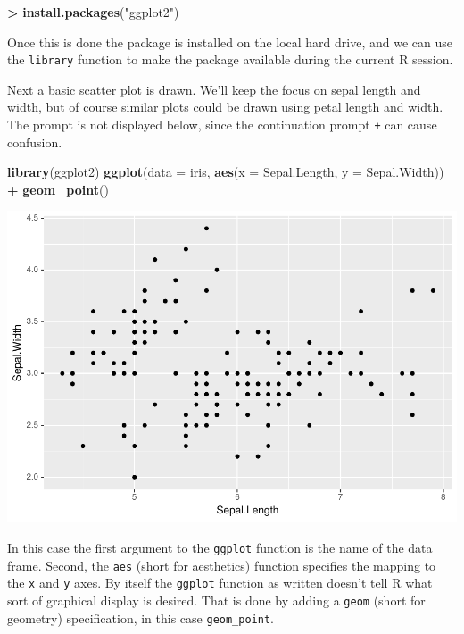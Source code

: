 \documentclass[
]{krantz}
\makeatletter
\newenvironment{Shaded}{\begin{snugshade}}{\end{snugshade}}
\newcommand{\DataTypeTok}[1]{\textcolor[rgb]{0.27,0.27,0.27}{#1}}
\newcommand{\KeywordTok}[1]{\textcolor[rgb]{0.27,0.27,0.27}{\textbf{#1}}}
\newcommand{\NormalTok}[1]{#1}
\newcommand{\OperatorTok}[1]{\textcolor[rgb]{0.43,0.43,0.43}{\textbf{#1}}}
\newcommand{\StringTok}[1]{\textcolor[rgb]{0.5,0.5,0.5}{#1}}
\newenvironment{kframe}{%
\medskip{}
\setlength{\fboxsep}{.8em}
 \def\at@end@of@kframe{}%
 \ifinner\ifhmode%
  \def\at@end@of@kframe{\end{minipage}}%
  \begin{minipage}{\columnwidth}%
 \fi\fi%
 \def\FrameCommand##1{\hskip\@totalleftmargin \hskip-\fboxsep
 \colorbox{shadecolor}{##1}\hskip-\fboxsep
     \hskip-\linewidth \hskip-\@totalleftmargin \hskip\columnwidth}%
 \MakeFramed {\advance\hsize-\width
   \@totalleftmargin\z@ \linewidth\hsize
   \@setminipage}}%
 {\par\unskip\endMakeFramed%
 \at@end@of@kframe}
\renewenvironment{Shaded}{\begin{kframe}}{\end{kframe}}
\makeatother
\begin{document}
\begin{Shaded}
\begin{Highlighting}[]
\OperatorTok{\textgreater{}}\StringTok{ }\KeywordTok{install.packages}\NormalTok{(}\StringTok{"ggplot2"}\NormalTok{)}
\end{Highlighting}
\end{Shaded}

Once this is done the package is installed on the local hard drive, and we can use the \texttt{library} function to make the package available during the current R session.

Next a basic scatter plot is drawn. We'll keep the focus on sepal length and width, but of course similar plots could be drawn using petal length and width. The prompt is not displayed below, since the continuation prompt \texttt{+} can cause confusion.

\begin{Shaded}
\begin{Highlighting}[]
\KeywordTok{library}\NormalTok{(ggplot2)}
\KeywordTok{ggplot}\NormalTok{(}\DataTypeTok{data =}\NormalTok{ iris, }\KeywordTok{aes}\NormalTok{(}\DataTypeTok{x =}\NormalTok{ Sepal.Length, }\DataTypeTok{y =}\NormalTok{ Sepal.Width)) }\OperatorTok{+}\StringTok{ }
\StringTok{    }\KeywordTok{geom\_point}\NormalTok{()}
\end{Highlighting}
\end{Shaded}

\includegraphics{bookdown_files/figure-latex/unnamed-chunk-58-1.pdf}

In this case the first argument to the \texttt{ggplot} function is the name of the data frame. Second, the \texttt{aes} (short for aesthetics) function specifies the mapping to the \texttt{x} and \texttt{y} axes. By itself the \texttt{ggplot} function as written doesn't tell R what sort of graphical display is desired. That is done by adding a \texttt{geom} (short for geometry) specification, in this case \texttt{geom\_point}.
\end{document}
